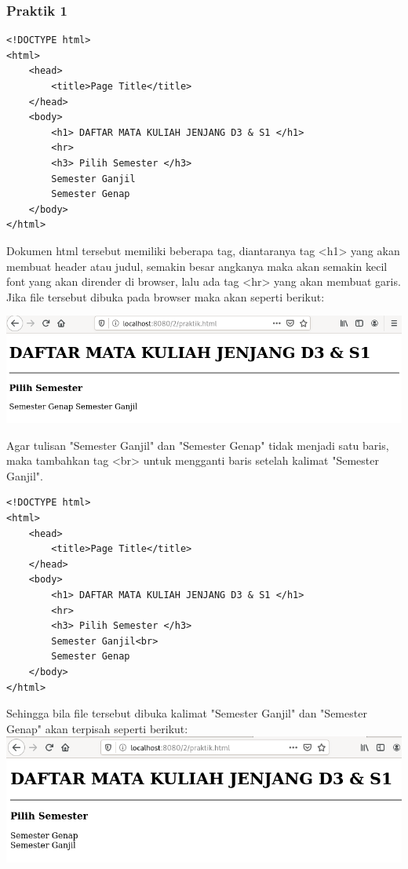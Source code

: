 \documentclass[a4paper,12pt]{article}
\begin{document}
\subsubsection{Praktik 1}
\begin{lstlisting}
<!DOCTYPE html>
<html>
    <head>
        <title>Page Title</title>
    </head>
    <body>
        <h1> DAFTAR MATA KULIAH JENJANG D3 & S1 </h1>
        <hr>
        <h3> Pilih Semester </h3>
        Semester Ganjil
        Semester Genap
    </body>
</html>
\end{lstlisting}
Dokumen html tersebut memiliki beberapa tag, diantaranya tag <h1> yang akan membuat header atau judul, semakin besar angkanya maka akan semakin kecil font yang akan dirender di browser, 
lalu ada tag <hr> yang akan membuat garis. Jika file tersebut dibuka pada browser maka akan seperti berikut:\\
\begin{center}
    \includegraphics[width=\linewidth]{1.png} 
\end{center}
Agar tulisan "Semester Ganjil" dan "Semester Genap" tidak menjadi satu baris, maka tambahkan tag <br> untuk mengganti baris setelah kalimat "Semester Ganjil".
\begin{lstlisting}
<!DOCTYPE html>
<html>
    <head>
        <title>Page Title</title>
    </head>
    <body>
        <h1> DAFTAR MATA KULIAH JENJANG D3 & S1 </h1>
        <hr>
        <h3> Pilih Semester </h3>
        Semester Ganjil<br>
        Semester Genap
    </body>
</html>
\end{lstlisting}
Sehingga bila file tersebut dibuka kalimat "Semester Ganjil" dan "Semester Genap" akan terpisah seperti berikut:\\
\includegraphics[width=\linewidth]{2.png}
\end{document}

